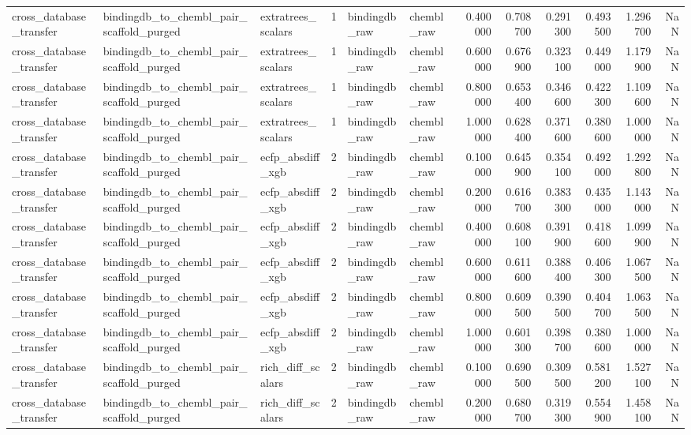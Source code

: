 \begin{longtable}{lllrllrrrrrr}
cross\_database\_transfer & bindingdb\_to\_chembl\_pair\_scaffold\_purged & extratrees\_scalars & 1 & bindingdb\_raw & chembl\_raw & 0.400000 & 0.708700 & 0.291300 & 0.493500 & 1.296700 & NaN \\
cross\_database\_transfer & bindingdb\_to\_chembl\_pair\_scaffold\_purged & extratrees\_scalars & 1 & bindingdb\_raw & chembl\_raw & 0.600000 & 0.676900 & 0.323100 & 0.449000 & 1.179900 & NaN \\
cross\_database\_transfer & bindingdb\_to\_chembl\_pair\_scaffold\_purged & extratrees\_scalars & 1 & bindingdb\_raw & chembl\_raw & 0.800000 & 0.653400 & 0.346600 & 0.422300 & 1.109600 & NaN \\
cross\_database\_transfer & bindingdb\_to\_chembl\_pair\_scaffold\_purged & extratrees\_scalars & 1 & bindingdb\_raw & chembl\_raw & 1.000000 & 0.628400 & 0.371600 & 0.380600 & 1.000000 & NaN \\
cross\_database\_transfer & bindingdb\_to\_chembl\_pair\_scaffold\_purged & ecfp\_absdiff\_xgb & 2 & bindingdb\_raw & chembl\_raw & 0.100000 & 0.645900 & 0.354100 & 0.492000 & 1.292800 & NaN \\
cross\_database\_transfer & bindingdb\_to\_chembl\_pair\_scaffold\_purged & ecfp\_absdiff\_xgb & 2 & bindingdb\_raw & chembl\_raw & 0.200000 & 0.616700 & 0.383300 & 0.435000 & 1.143000 & NaN \\
cross\_database\_transfer & bindingdb\_to\_chembl\_pair\_scaffold\_purged & ecfp\_absdiff\_xgb & 2 & bindingdb\_raw & chembl\_raw & 0.400000 & 0.608100 & 0.391900 & 0.418600 & 1.099900 & NaN \\
cross\_database\_transfer & bindingdb\_to\_chembl\_pair\_scaffold\_purged & ecfp\_absdiff\_xgb & 2 & bindingdb\_raw & chembl\_raw & 0.600000 & 0.611600 & 0.388400 & 0.406300 & 1.067500 & NaN \\
cross\_database\_transfer & bindingdb\_to\_chembl\_pair\_scaffold\_purged & ecfp\_absdiff\_xgb & 2 & bindingdb\_raw & chembl\_raw & 0.800000 & 0.609500 & 0.390500 & 0.404700 & 1.063500 & NaN \\
cross\_database\_transfer & bindingdb\_to\_chembl\_pair\_scaffold\_purged & ecfp\_absdiff\_xgb & 2 & bindingdb\_raw & chembl\_raw & 1.000000 & 0.601300 & 0.398700 & 0.380600 & 1.000000 & NaN \\
cross\_database\_transfer & bindingdb\_to\_chembl\_pair\_scaffold\_purged & rich\_diff\_scalars & 2 & bindingdb\_raw & chembl\_raw & 0.100000 & 0.690500 & 0.309500 & 0.581200 & 1.527100 & NaN \\
cross\_database\_transfer & bindingdb\_to\_chembl\_pair\_scaffold\_purged & rich\_diff\_scalars & 2 & bindingdb\_raw & chembl\_raw & 0.200000 & 0.680700 & 0.319300 & 0.554900 & 1.458100 & NaN \\

\end{longtable}
